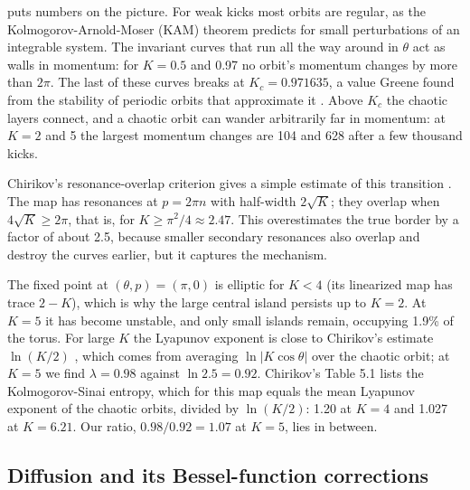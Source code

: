  puts numbers on the picture. For weak kicks most orbits are regular, as the
Kolmogorov-Arnold-Moser (KAM) theorem predicts for small perturbations of an integrable system. The
invariant curves that run all the way around in $\theta$ act as walls in momentum: for $K = 0.5$ and 0.97 no
orbit's momentum changes by more than $2\pi$. The last of these curves breaks at
$K_c = 0.971635$, a value Greene found from the stability of periodic orbits that approximate it
\cite{Greene1979}. Above $K_c$ the chaotic layers connect, and a chaotic orbit can wander arbitrarily far in
momentum: at $K = 2$ and 5 the largest momentum changes are 104 and 628 after a few thousand kicks.

Chirikov's resonance-overlap criterion gives a simple estimate of this transition \cite{Chirikov1979}. The
map has resonances at $p = 2\pi n$ with half-width $2\sqrt K$; they overlap when $4\sqrt K \ge 2\pi$, that is,
for $K \ge \pi^2/4 \approx 2.47$. This overestimates the true border by a factor of about 2.5, because
smaller secondary resonances also overlap and destroy the curves earlier, but it captures the mechanism.

The fixed point at $(\theta, p) = (\pi, 0)$ is elliptic for $K < 4$ (its linearized map has trace $2 - K$),
which is why the large central island persists up to $K = 2$. At $K = 5$ it has become unstable, and only
small islands remain, occupying 1.9\% of the torus. For large $K$ the Lyapunov exponent is close to
Chirikov's estimate $\ln(K/2)$ \cite{Chirikov1979}, which comes from averaging $\ln|K\cos\theta|$ over the
chaotic orbit; at $K = 5$ we find $\lambda = 0.98$ against $\ln 2.5 = 0.92$. Chirikov's Table 5.1 lists the
Kolmogorov-Sinai entropy, which for this map equals the mean Lyapunov exponent of the chaotic orbits, divided by
$\ln(K/2)$: 1.20 at $K = 4$ and 1.027 at $K = 6.21$. Our ratio, $0.98/0.92 = 1.07$ at $K = 5$, lies in
between.

\subsection{Diffusion and its Bessel-function corrections}
\label{sec:diffusion}

